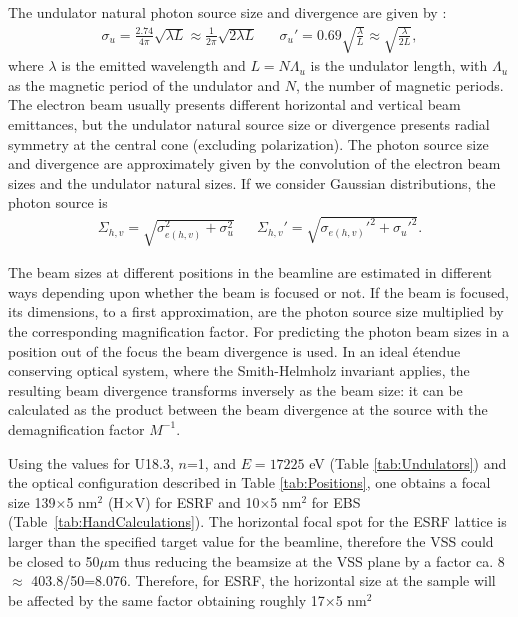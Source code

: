 \documentclass{iucr}              %
\newcommand{\inred}[1]{{\color{red}#1}}
\begin{document}
The undulator natural photon source size and divergence are given by \cite{elleaume}:
\begin{align}
    \label{eq:photon small sigmas}
    \sigma_u=\frac{2.74}{4\pi}\sqrt{\lambda L}\approx \frac{1}{2  \pi}\sqrt{2 \lambda L}  && \sigma_u' = 0.69\sqrt{\frac{\lambda}{L}}\approx \sqrt{\frac{\lambda}{2 L}},
\end{align}
where $\lambda$ is the emitted wavelength and $L=N\Lambda_u$ is the undulator length, with $\Lambda_u$ as the magnetic period of the undulator and $N$, the number of magnetic periods. The electron beam usually presents different horizontal and vertical beam emittances, but the undulator natural source size or divergence presents radial symmetry at the central cone (excluding polarization). The photon source size and divergence are approximately given by the convolution of the electron beam sizes and the undulator natural sizes. If we consider Gaussian distributions, the photon source is
\begin{align}
\label{eq:photon big sigmas}
\Sigma_{h,v}=\sqrt{\sigma_{e(h,v)}^2 + \sigma_u^2} && \Sigma_{h,v}'=\sqrt{\sigma_{e(h,v)}'^2 + \sigma_u'^2}.
\end{align}

The beam sizes at different positions in the beamline are estimated in different ways depending upon whether the beam is focused or not. If the beam is focused, its dimensions, to a first approximation, are the photon source size multiplied by the corresponding magnification factor. For predicting the photon beam sizes in a position out of the focus the beam divergence is used. In an ideal {\'{e}}tendue conserving optical system, where the Smith-Helmholz invariant applies, the resulting beam divergence transforms inversely as the beam size: it can be calculated as the product between the beam divergence at the source with the demagnification factor $M^{-1}$.

Using the values for U18.3, $n$=1, and  $E=17225$ eV (Table \ref{tab:Undulators}) and the optical configuration described in Table \ref{tab:Positions}, one obtains a focal size 139$\times$5 nm$^2$ (H$\times$V) for ESRF and 10$\times$5 nm$^2$ for EBS (Table~\ref{tab:HandCalculations}). The horizontal focal spot for the ESRF lattice is larger than the specified target value for the beamline, therefore the VSS could be closed to 50$\mu$m thus reducing the beamsize at the VSS plane by a factor ca. 8 \inred{$\approx$ 403.8/50=8.076}. Therefore, for ESRF, the horizontal size at the sample will be affected by the same factor obtaining roughly 17$\times$5 nm$^2$
\end{document}
